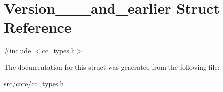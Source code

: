 \hypertarget{a00153}{\section{Version\-\_\-\_\-\_\-and\-\_\-earlier Struct Reference}
\label{a00153}
}


{\ttfamily \#include $<$cc\-\_\-types.\-h$>$}



The documentation for this struct was generated from the following file\-:\begin{DoxyCompactItemize}
\item 
src/core/\hyperlink{a00216}{cc\-\_\-types.\-h}\end{DoxyCompactItemize}
